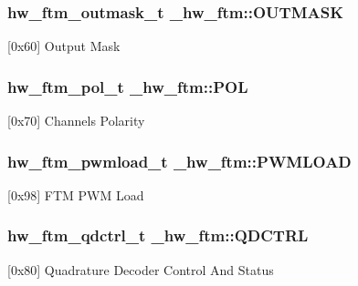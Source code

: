 \subsubsection[{\texorpdfstring{O\+U\+T\+M\+A\+SK}{OUTMASK}}]{ {\bf hw\+\_\+ftm\+\_\+outmask\+\_\+t} \+\_\+hw\+\_\+ftm\+::\+O\+U\+T\+M\+A\+SK}\hypertarget{struct__hw__ftm_a1a1ddad5fd1f961680a12e7f2648abaa}{}\label{struct__hw__ftm_a1a1ddad5fd1f961680a12e7f2648abaa}
\mbox{[}0x60\mbox{]} Output Mask 
\subsubsection[{\texorpdfstring{P\+OL}{POL}}]{ {\bf hw\+\_\+ftm\+\_\+pol\+\_\+t} \+\_\+hw\+\_\+ftm\+::\+P\+OL}\hypertarget{struct__hw__ftm_aecdc8dc136ce3a26b7bdce448267d50d}{}\label{struct__hw__ftm_aecdc8dc136ce3a26b7bdce448267d50d}
\mbox{[}0x70\mbox{]} Channels Polarity 
\subsubsection[{\texorpdfstring{P\+W\+M\+L\+O\+AD}{PWMLOAD}}]{ {\bf hw\+\_\+ftm\+\_\+pwmload\+\_\+t} \+\_\+hw\+\_\+ftm\+::\+P\+W\+M\+L\+O\+AD}\hypertarget{struct__hw__ftm_a7f4e4977152bd075330e60d24675757b}{}\label{struct__hw__ftm_a7f4e4977152bd075330e60d24675757b}
\mbox{[}0x98\mbox{]} F\+TM P\+WM Load 
\subsubsection[{\texorpdfstring{Q\+D\+C\+T\+RL}{QDCTRL}}]{ {\bf hw\+\_\+ftm\+\_\+qdctrl\+\_\+t} \+\_\+hw\+\_\+ftm\+::\+Q\+D\+C\+T\+RL}\hypertarget{struct__hw__ftm_a8fbfcef210a0eccee8fe5a08def752da}{}\label{struct__hw__ftm_a8fbfcef210a0eccee8fe5a08def752da}
\mbox{[}0x80\mbox{]} Quadrature Decoder Control And Status 
